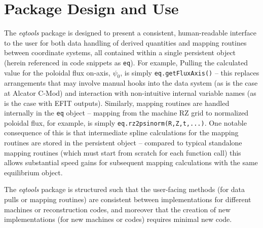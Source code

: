\documentclass[12pt,floatfix,showpacs]{revtex4-1}
\newcommand{\gnote}[1]{\marginpar{\textcolor{red}{\scriptsize{#1}}}}
\begin{document}
\section{Package Design and Use}\label{sec:design}

The \emph{eqtools} package is designed to present a consistent, human-readable interface to the user for both data handling of derived quantities and mapping routines between coordinate systems, all contained within a single persistent object (herein referenced in code snippets as \verb|eq|).  For example, Pulling the calculated value for the poloidal flux on-axis, $\psi_0$, is simply \verb|eq.getFluxAxis()| -- this replaces arrangements that may involve manual hooks into the data system (as is the case at Alcator C-Mod) and interaction with non-intuitive internal variable names (as is the case with EFIT outputs\gnote{too harsh?}).  Similarly, mapping routines are handled internally in the \verb|eq| object -- mapping from the machine RZ grid to normalized poloidal flux, for example, is simply \verb|eq.rz2psinorm(R,Z,t,...)|.  One notable consequence of this is that intermediate spline calculations for the mapping routines are stored in the persistent object -- compared to typical standalone mapping routines (which must start from scratch for each function call) this allows substantial speed gains for subsequent mapping calculations with the same equilibrium object.

The \emph{eqtools} package is structured such that the user-facing methods (for data pulls or mapping routines) are consistent between implementations for different machines or reconstruction codes, and moreover that the creation of new implementations (for new machines or codes) requires minimal new code.
\end{document}
